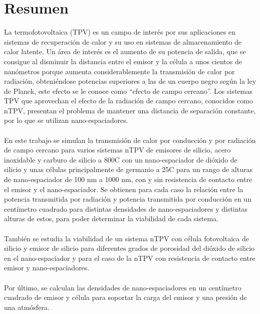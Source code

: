 \chapter{Resumen}

La termofotovoltaica (TPV) es un campo de interés por sus aplicaciones en sistemas de recuperación de calor y su uso en sistemas de almacenamiento de calor latente. Un área de interés es el aumento de su potencia de salida, que se consigue al  disminuir la distancia entre el emisor y la célula a unos cientos de nanómetros porque aumenta considerablemente la transmisión de calor por radiación, obteniéndose potencias superiores a las de un cuerpo negro según la ley de Planck, este efecto se le conoce como ``efecto de campo cercano''. Los sistemas TPV que aprovechan el efecto de la radiación de campo cercano, conocidos como nTPV, presentan el problema de mantener una distancia de separación constante, por lo que se utilizan nano-espaciadores.\\\\
En este trabajo se simulan la transmisión de calor por conducción y por radiación de campo cercano para varios sistemas nTPV de emisores de silicio, acero inoxidable y carburo de silicio a 800\textdegree C con un nano-espaciador de dióxido de silicio y unas células principalmente de germanio a 25\textdegree C para un rango de alturas de nano-espaciador de 100 nm a 1000 nm, con y sin resistencia de contacto entre el emisor y el nano-espaciador. Se obtienen para cada caso la relación entre la potencia transmitida por radiación y potencia transmitida por conducción en un centímetro cuadrado para distintas densidades de nano-espaciadores y distintas alturas de estos, para poder determinar la viabilidad de cada sistema.\\\\
También se estudia la viabilidad de un sistema nTPV con célula fotovoltaica de silicio y emisor de silicio para diferentes grados de porosidad del dióxido de silicio en el nano-espaciador y para el caso de la nTPV con resistencia de contacto entre emisor y nano-espaciadores.\\\\
Por último, se calculan las densidades de nano-espaciadores en un centímetro cuadrado de emisor y célula para soportar la carga del emisor y una presión de una atmósfera. 

